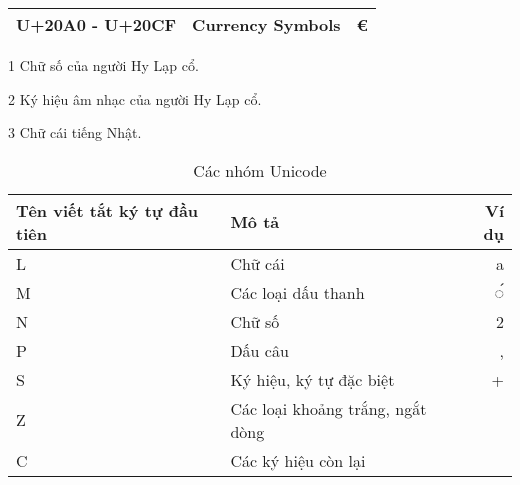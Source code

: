 \begin{table}[htb]
\begin{threeparttable}
\begin{tabular}{llr}
            U+20A0 - U+20CF   & Currency Symbols                        & €              \\
            \bottomrule
        \end{tabular}
        \begin{tablenotes}
            \item [1] Chữ số của người Hy Lạp cổ.
            \item [2] Ký hiệu âm nhạc của người Hy Lạp cổ.
            \item [3] Chữ cái tiếng Nhật.
        \end{tablenotes}
    \end{threeparttable}
\end{table}

\begin{table}[htb]
    \centering
    \caption{Các nhóm Unicode}
    \label{table:unicode-categories}
    \begin{tabular}{llr}
        \toprule
        \textbf{Tên viết tắt ký tự đầu tiên} & \textbf{Mô tả}                   & \textbf{Ví dụ} \\\midrule
        L                                    & Chữ cái                          & a              \\
        M                                    & Các loại dấu thanh               & ◌́              \\
        N                                    & Chữ số                           & 2              \\
        P                                    & Dấu câu                          & ,              \\
        S                                    & Ký hiệu, ký tự đặc biệt          & +              \\
        Z                                    & Các loại khoảng trắng, ngắt dòng &                \\
        C                                    & Các ký hiệu còn lại              &                \\
        \bottomrule
    \end{tabular}
\end{table}

